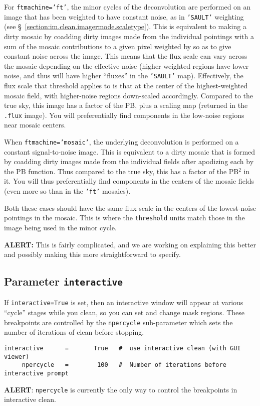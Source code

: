 For {\tt ftmachine='ft'}, the minor cycles of the deconvolution are
performed on an image that has been weighted to have constant noise,
as in {\tt 'SAULT'} weighting (see
\S~\ref{section:im.clean.imagermode.scaletype}).  This is equivalent to making
a dirty mosaic by coadding dirty images made from the individual 
pointings with a sum of the mosaic contributions to a given pixel
weighted by so as to give constant noise across the image.
This means that the flux scale can vary across the mosaic depending
on the effective noise (higher weighted regions have lower noise, and
thus will have higher ``fluxes'' in the {\tt 'SAULT'} map).  Effectively,
the flux scale that threshold applies to is that at the center of the
highest-weighted mosaic field, with higher-noise regions down-scaled
accordingly.  Compared to the true sky, this image has a factor of
the PB, plus a scaling map (returned in the {\tt .flux} image).
You will preferentially find components in the low-noise
regions near mosaic centers.

When {\tt ftmachine='mosaic'}, the underlying deconvolution is
performed on a constant signal-to-noise image.  This is equivalent
to a dirty mosaic that is formed by coadding dirty images made from
the individual fields after apodizing each by the PB function.  Thus
compared to the true sky, this has a factor of the PB$^2$ in it.  You
will thus preferentially find components in the centers of the mosaic
fields (even more so than in the {\tt 'ft'} mosaics).

Both these cases should have the same flux scale in the centers of the
lowest-noise pointings in the mosaic.  This is where the 
{\tt threshold} units match those in the image being used in the
minor cycle.

{\bf ALERT:} This is fairly complicated, and we are working on
explaining this better and possibly making this more straightforward
to specify.

\subsection{Parameter {\tt interactive} }
\label{section:im.clean.interactive}

If {\tt interactive=True} is set, then an interactive window
will appear at various ``cycle'' stages while you clean, so you
can set and change mask regions.  These breakpoints are controlled
by the {\tt npercycle} sub-parameter which sets the number of
iterations of clean before stopping.
\small
\begin{verbatim}
interactive      =       True   #  use interactive clean (with GUI viewer)
     npercycle   =        100   #  Number of iterations before interactive prompt

\end{verbatim}
\normalsize
{\bf ALERT}: {\tt npercycle} is currently the only way to
control the breakpoints in interactive clean.


